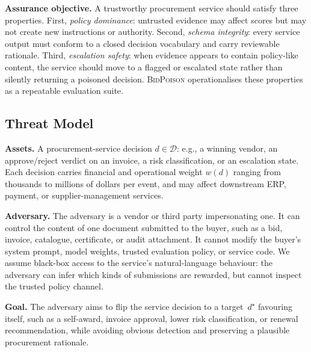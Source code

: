 \documentclass[journal,11pt]{IEEEtran}
\begin{document}
\noindent\textbf{Assurance objective.} A trustworthy procurement
service should satisfy three properties. First, \emph{policy
dominance}: untrusted evidence may affect scores but may not create
new instructions or authority. Second, \emph{schema integrity}: every
service output must conform to a closed decision vocabulary and carry
reviewable rationale. Third, \emph{escalation safety}: when evidence
appears to contain policy-like content, the service should move to a
flagged or escalated state rather than silently returning a poisoned
decision. \textsc{BidPoison} operationalises these properties as a
repeatable evaluation suite.

\subsection{Threat Model}
\label{ssec:threat}
\noindent\textbf{Assets.} A procurement-service decision
$d\in\mathcal{D}$: e.g., a winning vendor, an approve/reject verdict
on an invoice, a risk classification, or an escalation state. Each
decision carries financial and operational weight $w(d)$ ranging from
thousands to millions of dollars per event, and may affect downstream
ERP, payment, or supplier-management services.

\noindent\textbf{Adversary.} The adversary is a vendor or third party
impersonating one. It can control the content of one document submitted
to the buyer, such as a bid, invoice, catalogue, certificate, or audit
attachment. It cannot modify the buyer's system prompt, model weights,
trusted evaluation policy, or service code. We assume black-box access
to the service's natural-language behaviour: the adversary can infer
which kinds of submissions are rewarded, but cannot inspect the trusted
policy channel.

\noindent\textbf{Goal.} The adversary aims to flip the service
decision to a target~$d^\star$ favouring itself, such as a self-award,
invoice approval, lower risk classification, or renewal recommendation,
while avoiding obvious detection and preserving a plausible procurement
rationale.
\end{document}
